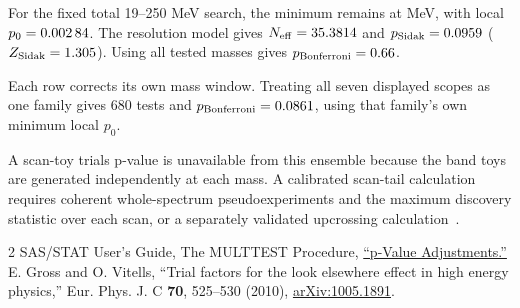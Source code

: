\documentclass[11pt]{article}
\begin{document}


For the fixed total 19--250 MeV search, the minimum remains at
\GlobalMinMass{} MeV, with local $p_0=\num{0.00284}$. The resolution model gives
$N_{\rm eff}=35.3814$ and $p_{\rm Sidak}=\num{0.0959}$
($Z_{\rm Sidak}=1.305$). Using all \GlobalGridCount{} tested masses gives
$p_{\rm Bonferroni}=\num{0.66}$.

Each row corrects its own mass window. Treating all seven displayed scopes as
one family gives 680 tests and $p_{\rm Bonferroni}=\num{0.0861}$,
using that family's own minimum local $p_0$.

A scan-toy trials p-value is unavailable from this ensemble because the
\StageToys{} band toys are generated independently at each mass. A calibrated
scan-tail calculation requires coherent whole-spectrum pseudoexperiments and
the maximum discovery statistic over each scan, or a separately validated
upcrossing calculation~\cite{grossvitells}.

\begin{thebibliography}{2}
 SAS/STAT User's Guide, The MULTTEST Procedure,
\href{https://support.sas.com/documentation/cdl/en/statug/66859/HTML/default/statug_multtest_details11.htm}{``p-Value Adjustments.''}
 E. Gross and O. Vitells, ``Trial factors for the
look elsewhere effect in high energy physics,'' Eur. Phys. J. C \textbf{70},
525--530 (2010), \href{https://arxiv.org/abs/1005.1891}{arXiv:1005.1891}.
\end{thebibliography}
\end{document}
